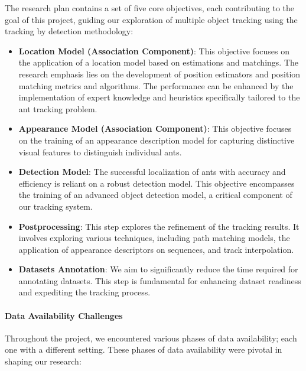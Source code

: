 {
    The research plan contains a set of five core objectives, each contributing to the goal of this project, 
    guiding our exploration of multiple object tracking using the tracking by detection methodology:
}

\begin{itemize}
    \item {
        \textbf{Location Model (Association Component)}:  
        This objective focuses on the application of a location model based on estimations and matchings. 
        The research emphasis lies on the development of position estimators and position matching metrics and algorithms.
        The performance can be enhanced by the implementation of expert knowledge and heuristics specifically tailored to the ant tracking problem. 
        }
    \item {
        \textbf{Appearance Model (Association Component)}: 
        This objective focuses on the training of an appearance description model for capturing distinctive visual features to distinguish individual ants.
    }
    \item {
        \textbf{Detection Model}: 
        The successful localization of ants with accuracy and efficiency is reliant on a robust detection model. 
        This objective encompasses the training of an advanced object detection model, a critical component of our tracking system.
    }
    \item {
        \textbf{Postprocessing}: 
        This step explores the refinement of the tracking results. 
        It involves exploring various techniques, including path matching models, the application of appearance descriptors on sequences, and track interpolation.
        }
    \item {
        \textbf{Datasets Annotation}: 
        We aim to significantly reduce the time required for annotating datasets. 
        This step is fundamental for enhancing dataset readiness and expediting the tracking process.
        }
\end{itemize}

\paragraph{Data Availability Challenges}

{
    Throughout the project, we encountered various phases of data availability; each one with a different setting. 
    These phases of data availability were pivotal in shaping our research: 
}

